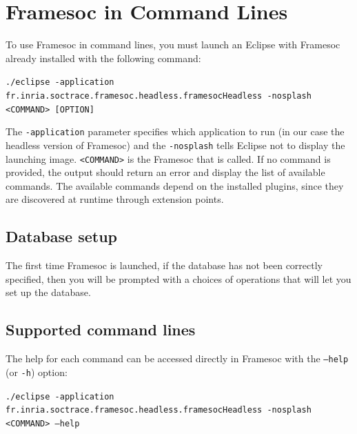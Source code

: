 \documentclass[twoside]{article}
\begin{document}
\begin{sloppypar}
\newpage
\section{Framesoc in Command Lines}
\label{app:headless}
To use Framesoc in command lines, you must launch an Eclipse with Framesoc already installed with the following command:
	
	 \texttt{./eclipse -application fr.inria.soctrace.framesoc.headless.framesocHeadless -nosplash <COMMAND> [OPTION]}

The \texttt{-application} parameter specifies which application to run (in our case the headless version of Framesoc) and the \texttt{-nosplash} tells Eclipse not to display the launching image. \texttt{<COMMAND>} is the Framesoc that is called. If no command is provided, the output should return an error and display the list of available commands. The available commands depend on the installed plugins, since they are discovered at runtime through extension points.

\subsection{Database setup}
The first time Framesoc is launched, if the database has not been correctly specified, then you will be prompted with a choices of operations that will let you set up the database. 

\subsection{Supported command lines}
The help for each command can be accessed directly in Framesoc with the \texttt{--help} (or \texttt{-h}) option:

	\texttt{./eclipse -application fr.inria.soctrace.framesoc.headless.framesocHeadless -nosplash <COMMAND> --help}



\newpage
\renewcommand{\refname}{References}
{}


\end{sloppypar} 
\end{document}
